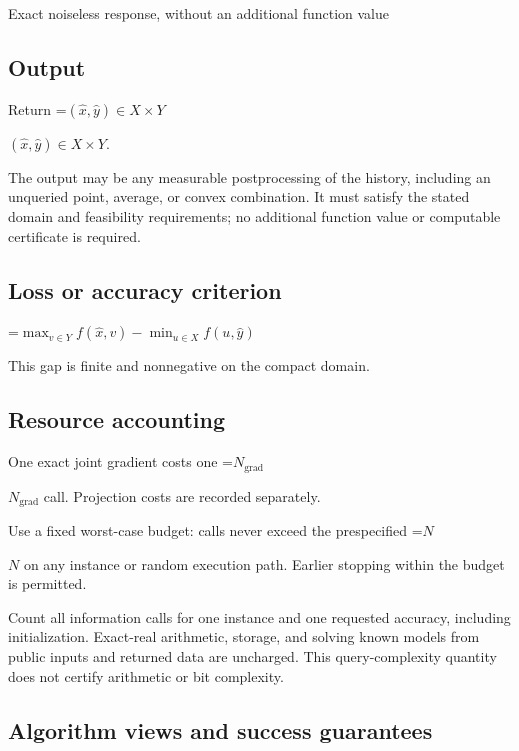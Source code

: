 \documentclass[10pt,a4paper]{article}
\newcommand{\AtlasMath}[1]{\par\begingroup\centering\setbox0=\hbox{$\displaystyle #1$}\ifdim\wd0>1.4\linewidth\typeout{ATLAS WIDE FORMULA: \the\wd0}\fi\ifdim\wd0>\linewidth\resizebox{\linewidth}{!}{\box0}\else\box0\fi\par\endgroup}
\newcommand{\AtlasInlineMath}[1]{\begingroup\setbox0=\hbox{$#1$}\ifdim\wd0>.4\linewidth\endgroup\AtlasMath{#1}\else\endgroup$#1$\fi}
\begin{document}
Exact noiseless response, without an additional function value



\subsection{Output}


Return \AtlasInlineMath{(\widehat{x},\widehat{y})\in X\times Y}.



The output may be any measurable postprocessing of the history, including an unqueried point, average, or convex combination. It must satisfy the stated domain and feasibility requirements; no additional function value or computable certificate is required.



\subsection{Loss or accuracy criterion}



\AtlasMath{\max_{v\in Y}f(\widehat{x},v)-\min_{u\in X}f(u,\widehat{y})}




This gap is finite and nonnegative on the compact domain.



\subsection{Resource accounting}


One exact joint gradient costs one \AtlasInlineMath{N_{\mathrm{grad}}} call. Projection costs are recorded separately.



Use a fixed worst-case budget: calls never exceed the prespecified \AtlasInlineMath{N} on any instance or random execution path. Earlier stopping within the budget is permitted.



Count all information calls for one instance and one requested accuracy, including initialization. Exact-real arithmetic, storage, and solving known models from public inputs and returned data are uncharged. This query-complexity quantity does not certify arithmetic or bit complexity.



\subsection{Algorithm views and success guarantees}
\end{document}
